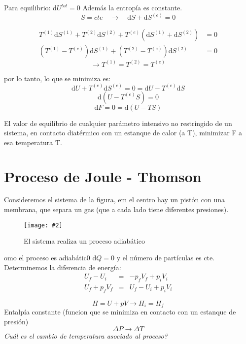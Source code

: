 \documentclass[10pt,twocolumn]{IEEEtran2e}
\newcommand{\ud}{\mathrm{d}}
\newcommand{\sfig}[4]{%
\begin{figure}[ht!]%
  \begin{center}%
    {\texttt{[image: \#2]}}%
  \end{center}%
  \caption{#3}%
  \label{fig:#2}%
\end{figure}%
}
\begin{document}
Para equilibrio: $\ud U^{tot}=0$
Adem\'as la entrop\'ia es constante.
\begin{equation}
 S=cte\quad \rightarrow \quad \ud S + \ud S^{(e)} = 0
\end{equation}

\begin{eqnarray}
  T^{(1)} \ud S^{(1)} + T^{(2)} \ud S^{(2)} +T^{(e)} (\ud S^{(1)} + \ud S^{(2)})&=0 \\
 (T^{(1)} - T^{(e)} )\ud S^{(1)} + (T^{(2)} - T^{(e)} )\ud S^{(2)} &= 0
\end{eqnarray}
\begin{equation}
  \rightarrow T^{(1)}=T^{(2)}=T^{(e)}
\end{equation}

por lo tanto, lo que se minimiza es:
\begin{equation}
 \ud U + T^{(e)}\ud S^{(e)} = 0 = \ud U - T^{(e)} \ud S
\end{equation}
\begin{equation}
 \ud (U - T^{(e)} S) = 0
\end{equation}
\begin{equation}
 \ud F = 0 = \ud (U-TS)
\end{equation}

El valor de equilibrio de cualquier par\'ametro intensivo no restringido de un sistema, en contacto diat\'ermico con un estanque de calor (a T), minimizar F a esa temperatura T.

\section{Proceso de Joule - Thomson}
Consideremos el sistema de la figura, em el centro hay un pist\'on con una membrana, que separa un gas (que a cada lado tiene diferentes presiones).
 
\sfig{1.00}{Diagram1}{El sistema realiza un proceso adiab\'atico}


Como el proceso es adiab\'atic0 $\ud Q = 0$ y el n\'umero de part\'iculas es cte. Determinemos la diferencia de energ\'ia:
\begin{eqnarray}
 U_{f}-U_{i} & = & -p_{f}V_{f} + p_{i}V_{i} \\
 U_{f} + p_{f}V_{f} & = & U_{f}-U_{i}+ p_{i}V_{i}
\end{eqnarray}

\begin{equation}
 H = U + pV \rightarrow H_{i} = H_{f}
\end{equation}
Entalp\'ia constante (funcion que se minimiza en contacto con un estanque de presi\'on)
\begin{equation}
 \Delta P \rightarrow \Delta T
\end{equation}
\textit{Cu\'al es el cambio de temperatura asociado al proceso?}
\end{document}
